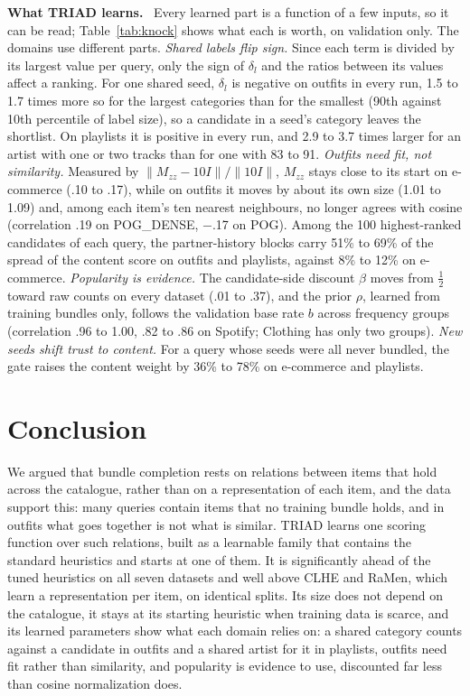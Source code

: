 \documentclass[runningheads]{llncs}
\renewcommand{\paragraph}[1]{\smallskip\noindent\textbf{#1}\ }
\begin{document}
\paragraph{What TRIAD learns.} Every learned part is a function of a few inputs, so it can be read; Table~\ref{tab:knock}
shows what each is worth, on validation only. The domains use different parts.
\emph{Shared labels flip sign.} Since each term is divided by its largest value per query, only the sign of
$\delta_l$ and the ratios between its values affect a ranking. For one shared seed, $\delta_l$ is negative on outfits
in every run, 1.5 to 1.7 times more so for the largest categories than for the smallest (90th against 10th percentile
of label size), so a candidate in a seed's category leaves the shortlist. On playlists it is positive in every run,
and 2.9 to 3.7 times larger for an artist with one or two tracks than for one with 83 to 91. \emph{Outfits need fit, not similarity.} Measured by $\lVert M_{zz}-10I\rVert/\lVert10I\rVert$, $M_{zz}$ stays close to
its start on e-commerce (.10 to .17), while on outfits it moves by about its own size (1.01 to 1.09) and, among each item's ten nearest
neighbours, no longer agrees with cosine (correlation .19 on POG\_DENSE, $-$.17 on POG). Among the 100 highest-ranked candidates of each query, the partner-history blocks
carry 51\% to 69\% of the spread of the content score on outfits and playlists, against 8\% to 12\% on e-commerce. \emph{Popularity is evidence.} The candidate-side discount $\beta$ moves from $\tfrac12$ toward raw counts
on every dataset (.01 to .37), and the prior $\rho$, learned from training bundles only, follows the validation base
rate $b$ across frequency groups (correlation .96 to 1.00, .82 to .86 on Spotify; Clothing has only two groups). \emph{New seeds shift trust to
content.} For a query whose seeds were all never bundled, the gate raises the content weight by 36\% to 78\% on
e-commerce and playlists.

\section{Conclusion}

We argued that bundle completion rests on relations between items that hold across the catalogue, rather than on a
representation of each item, and the data support this: many queries contain items that no training bundle holds, and
in outfits what goes together is not what is similar. TRIAD learns one scoring function over such relations, built as
a learnable family that contains the standard heuristics and starts at one of them. It is significantly ahead of the
tuned heuristics on all seven datasets and well above CLHE and RaMen, which learn a representation per item, on
identical splits. Its size does not depend on the catalogue, it stays at its starting heuristic when training data is
scarce, and its learned parameters show what each domain relies on: a shared category counts against a candidate in
outfits and a shared artist for it in playlists, outfits need fit rather than similarity, and popularity is evidence
to use, discounted far less than cosine normalization does.
\end{document}
